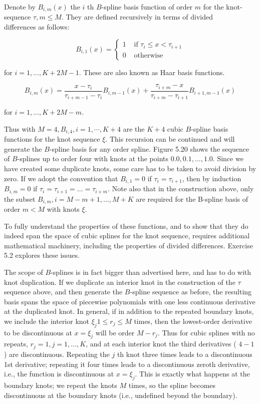\documentclass[10pt]{article}
\begin{document}
Denote by $B_{i, m}(x)$ the $i$ th $B$-spline basis function of order $m$ for the knot-sequence $\tau, m \leq M$. They are defined recursively in terms of divided\\
differences as follows:

\[
B_{i, 1}(x)= \begin{cases}1 & \text { if } \tau_{i} \leq x<\tau_{i+1}  \tag{5.77}\\ 0 & \text { otherwise }\end{cases}
\]

for $i=1, \ldots, K+2 M-1$. These are also known as Haar basis functions.


\begin{equation*}
B_{i, m}(x)=\frac{x-\tau_{i}}{\tau_{i+m-1}-\tau_{i}} B_{i, m-1}(x)+\frac{\tau_{i+m}-x}{\tau_{i+m}-\tau_{i+1}} B_{i+1, m-1}(x) \tag{5.78}
\end{equation*}


for $i=1, \ldots, K+2 M-m$.

Thus with $M=4, B_{i, 4}, i=1, \cdots, K+4$ are the $K+4$ cubic $B$-spline basis functions for the knot sequence $\xi$. This recursion can be continued and will generate the $B$-spline basis for any order spline. Figure 5.20 shows the sequence of $B$-splines up to order four with knots at the points $0.0,0.1, \ldots, 1.0$. Since we have created some duplicate knots, some care has to be taken to avoid division by zero. If we adopt the convention that $B_{i, 1}=0$ if $\tau_{i}=\tau_{i+1}$, then by induction $B_{i, m}=0$ if $\tau_{i}=\tau_{i+1}= \ldots=\tau_{i+m}$. Note also that in the construction above, only the subset $B_{i, m}, i=M-m+1, \ldots, M+K$ are required for the B-spline basis of order $m<M$ with knots $\xi$.

To fully understand the properties of these functions, and to show that they do indeed span the space of cubic splines for the knot sequence, requires additional mathematical machinery, including the properties of divided differences. Exercise 5.2 explores these issues.

The scope of $B$-splines is in fact bigger than advertised here, and has to do with knot duplication. If we duplicate an interior knot in the construction of the $\tau$ sequence above, and then generate the $B$-spline sequence as before, the resulting basis spans the space of piecewise polynomials with one less continuous derivative at the duplicated knot. In general, if in addition to the repeated boundary knots, we include the interior knot $\xi_{j} 1 \leq r_{j} \leq M$ times, then the lowest-order derivative to be discontinuous at $x=\xi_{j}$ will be order $M-r_{j}$. Thus for cubic splines with no repeats, $r_{j}=1, j=1, \ldots, K$, and at each interior knot the third derivatives ( $4-1$ ) are discontinuous. Repeating the $j$ th knot three times leads to a discontinuous 1st derivative; repeating it four times leads to a discontinuous zeroth derivative, i.e., the function is discontinuous at $x=\xi_{j}$. This is exactly what happens at the boundary knots; we repeat the knots $M$ times, so the spline becomes discontinuous at the boundary knots (i.e., undefined beyond the boundary).
\end{document}
